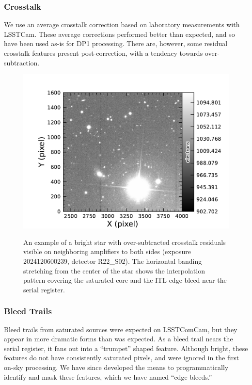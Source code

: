 \subsubsection{Crosstalk}
We use an average crosstalk correction based on laboratory measurements with LSSTCam.
These average corrections performed better than expected, and so have been used as-is for DP1 processing.
There are, however, some residual crosstalk features present post-correction, with a tendency towards over-subtraction.
\begin{figure}[htb!]
  \centering
  \includegraphics[width=0.98\linewidth]{figures/dp1_isr_anomalies-crosstalk_residual.pdf}
  \label{fig:crosstalk_residual}
  \caption{
    An example of a bright star with over-subtracted crosstalk residuals visible on neighboring amplifiers to both sides (exposure 2024120600239, detector R22\_S02).
    The horizontal banding stretching from the center of the star shows the interpolation pattern covering the saturated core and the ITL edge bleed near the serial register.
  }
\end{figure}

\subsubsection{Bleed Trails}
Bleed trails from saturated sources were expected on LSSTComCam, but they appear in more dramatic forms than was expected.
As a bleed trail nears the serial register, it fans out into a ``trumpet'' shaped feature.
Although bright, these features do not have consistently saturated pixels, and were ignored in the first on-sky processing.
We have since developed the means to programmatically identify and mask these features, which we have named ``edge bleeds.''

